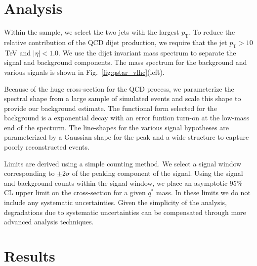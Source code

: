 \section{Analysis}

Within the sample, we select the two jets with the largest
$p_\mathrm{T}$.  To reduce the relative contribution of the QCD dijet
production, we require that the jet $p_\mathrm{T} > 10$\,TeV and $|\eta
| < 1.0$.  We use the dijet invariant mass spectrum to separate the
signal and background components.  The mass spectrum for the
background and various signals is shown in
Fig.~\ref{fig:qstar_vlhc}(left).  

Because of the huge cross-section for the QCD process, we parameterize
the spectral shape from a large sample of simulated events and scale
this shape to provide our background estimate.  The functional form
selected for the background is a exponential decay with an error
funtion turn-on at the low-mass end of the specturm.  The line-shapes
for the various signal hypotheses are parameterized by a Gaussian
shape for the peak and a wide structure to capture poorly
reconstructed events.

Limits are derived using a simple counting method.  We select a signal
window corresponding to $\pm 2\sigma$ of the peaking component of the
signal.  Using the signal and background counts within the signal
window, we place an asymptotic 95\% CL upper limit on the
cross-section for a given $q^*$ mass.  In these limits we do not
include any systematic uncertainties.  Given the simplicity of the
analysis, degradations due to systematic uncertainties can be
compensated through more advanced analysis techniques.

\section{Results}

